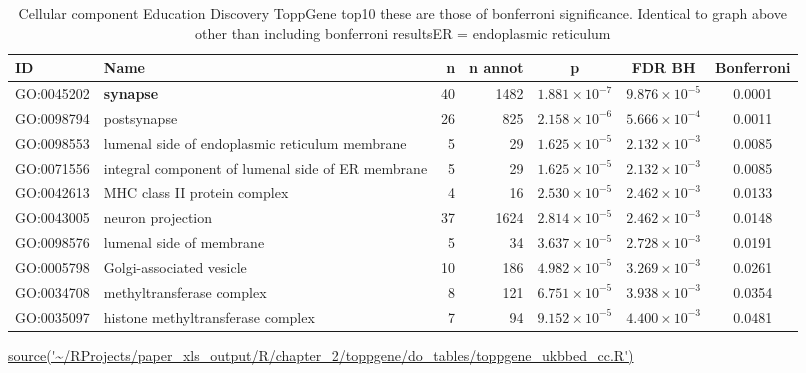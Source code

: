 \begin{table}[ht]
\centering
 \setlength{\extrarowheight}{2pt}
\begin{adjustbox}{width=\textwidth}

\begin{tabular}{llrrccc}
  \toprule
ID & Name & n & n annot & p & FDR BH & Bonferroni \\ 
  \midrule
GO:0045202 & \textbf{synapse} & 40 & 1482 & $1.881 \times 10^{-7}$ & $9.876 \times 10^{-5}$ & 0.0001 \\ 
  GO:0098794 & postsynapse & 26 & 825 & $2.158 \times 10^{-6}$ & $5.666 \times 10^{-4}$ & 0.0011 \\ 
  GO:0098553 & lumenal side of endoplasmic reticulum membrane & 5 & 29 & $1.625 \times 10^{-5}$ & $2.132 \times 10^{-3}$ & 0.0085 \\ 
  GO:0071556 & integral component of lumenal side of ER membrane & 5 & 29 & $1.625 \times 10^{-5}$ & $2.132 \times 10^{-3}$ & 0.0085 \\ 
  GO:0042613 & MHC class II protein complex & 4 & 16 & $2.530 \times 10^{-5}$ & $2.462 \times 10^{-3}$ & 0.0133 \\ 
  GO:0043005 & neuron projection & 37 & 1624 & $2.814 \times 10^{-5}$ & $2.462 \times 10^{-3}$ & 0.0148 \\ 
  GO:0098576 & lumenal side of membrane & 5 & 34 & $3.637 \times 10^{-5}$ & $2.728 \times 10^{-3}$ & 0.0191 \\ 
  GO:0005798 & Golgi-associated vesicle & 10 & 186 & $4.982 \times 10^{-5}$ & $3.269 \times 10^{-3}$ & 0.0261 \\ 
  GO:0034708 & methyltransferase complex & 8 & 121 & $6.751 \times 10^{-5}$ & $3.938 \times 10^{-3}$ & 0.0354 \\ 
  GO:0035097 & histone methyltransferase complex & 7 & 94 & $9.152 \times 10^{-5}$ & $4.400 \times 10^{-3}$ & 0.0481 \\ 
   \bottomrule
\end{tabular}
\end{adjustbox}
\caption{Cellular component Education Discovery ToppGene top10 these are those of bonferroni significance. Identical to graph above other than including bonferroni  resultsER = endoplasmic reticulum}
\tiny\url{source('~/RProjects/paper_xls_output/R/chapter_2/toppgene/do_tables/toppgene_ukbbed_cc.R')}
\label{tab:Cellular component Education Discovery ToppGene top10 results Bonfe}
\end{table}

